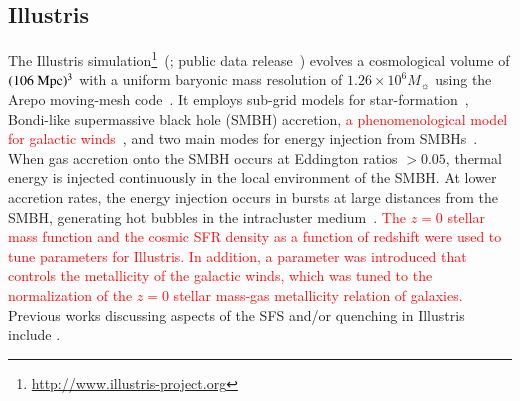 \documentclass[tighten, preprint]{aastex62}
\begin{document}
\subsection{Illustris}
The Illustris 
simulation\footnote{\url{http://www.illustris-project.org}}~(\citealt{vogelsberger2014,genel2014}; 
public data release~\citealt{nelson2015}) 
evolves a cosmological volume of $(106\ \rm{Mpc})^3$ with a uniform 
baryonic mass resolution of $1.26\times10^6M_{\sun}$ using the {\sc Arepo} 
moving-mesh code~\citep{springel2010}. 
It employs sub-grid models for star-formation~\citep{springel2003},
Bondi-like supermassive black hole (SMBH) accretion, \textcolor{red}{a phenomenological 
model for galactic winds~\citep[inspired by][]{oppenheimer2006}}, and two main modes for energy injection 
from SMBHs~\citep[see][]{vogelsberger2013}. When gas accretion onto the 
SMBH occurs at Eddington ratios $>0.05$, thermal energy is injected 
continuously in  the local environment of the SMBH. At lower accretion 
rates, the  energy injection occurs in bursts at large distances from the 
SMBH, generating hot bubbles in the intracluster medium~\citep{sijacki2007}.
\textcolor{red}{The $z=0$ stellar mass function and the cosmic SFR 
density as a function of redshift were used to tune parameters for Illustris. 
In addition, a parameter was introduced that controls the metallicity of the 
galactic winds, which was tuned to the normalization of the $z=0$ 
stellar mass-gas metallicity relation of galaxies.}
Previous works discussing aspects of the SFS and/or quenching in Illustris 
include \citet{genel2014, vogelsberger2014, sparre2015, bluck2016, terrazas2017}.
\end{document}
